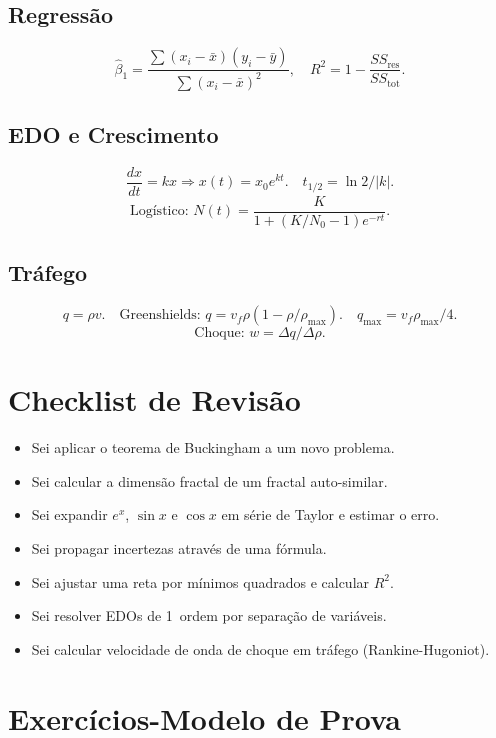 \documentclass[12pt,a4paper]{article}
\begin{document}
\subsection*{Regress\~ao}
\[
\hat\beta_1 = \frac{\sum(x_i-\bar x)(y_i-\bar y)}{\sum(x_i-\bar x)^2}, \quad R^2 = 1-\frac{SS_\text{res}}{SS_\text{tot}}.
\]

\subsection*{EDO e Crescimento}
\[
\frac{dx}{dt}=kx \Rightarrow x(t)=x_0 e^{kt}. \quad t_{1/2}=\ln2/|k|.
\]
\[
\text{Log\'istico: }N(t) = \frac{K}{1+(K/N_0-1)e^{-rt}}.
\]

\subsection*{Tr\'afego}
\[
q=\rho v. \quad \text{Greenshields: }q=v_f\rho(1-\rho/\rho_\text{max}). \quad q_\text{max}=v_f\rho_\text{max}/4.
\]
\[
\text{Choque: }w = \Delta q/\Delta\rho.
\]

\section*{Checklist de Revis\~ao}
\begin{itemize}
  \item[$\square$] Sei aplicar o teorema de Buckingham a um novo problema.
  \item[$\square$] Sei calcular a dimens\~ao fractal de um fractal auto-similar.
  \item[$\square$] Sei expandir $e^x$, $\sin x$ e $\cos x$ em s\'erie de Taylor e estimar o erro.
  \item[$\square$] Sei propagar incertezas atrav\'es de uma f\'ormula.
  \item[$\square$] Sei ajustar uma reta por m\'inimos quadrados e calcular $R^2$.
  \item[$\square$] Sei resolver EDOs de 1\textordfeminine\ ordem por separa\c{c}\~ao de vari\'aveis.
  \item[$\square$] Sei calcular velocidade de onda de choque em tr\'afego (Rankine-Hugoniot).
\end{itemize}

\section*{Exerc\'icios-Modelo de Prova}
\end{document}
